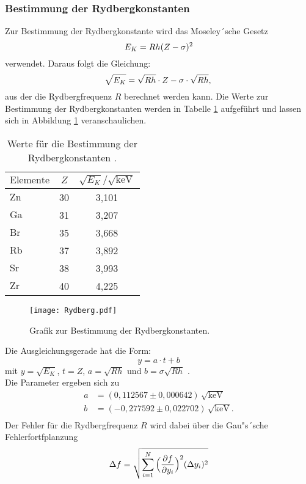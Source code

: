 \subsubsection{Bestimmung der Rydbergkonstanten}
Zur Bestimmung der Rydbergkonstante wird das Moseley´sche Gesetz
\begin{equation}
  E_K = Rh(Z-\sigma)^2 \\
 \end{equation}
 verwendet.
 Daraus folgt die Gleichung:
 \begin{equation}
  \sqrt{E_K} = \sqrt{Rh} \cdot Z- \sigma \cdot\sqrt{Rh},\\
 \end{equation}
 aus der die Rydbergfrequenz $R$ berechnet werden kann.
 Die Werte zur Bestimmung der Rydbergkonstanten werden in Tabelle \ref{tab:Rydberg} aufgeführt und  lassen sich in Abbildung \ref{fig:Rydberg} veranschaulichen.
 \begin{table}[H]
  \centering
  \caption{Werte für die Bestimmung der Rydbergkonstanten .}
  \label{tab:Rydberg}
  \begin{tabular}{|l|c|c|}
    \toprule
      $\text{Elemente}$ &  $Z $      &     $\sqrt{E_K}/\mathrm{\sqrt{keV}} $     \\
      \midrule
      $\text{Zn}$&30&3,101\\
      $\text{Ga}$&31&3,207\\
      $\text{Br}$&35&3,668\\
      $\text{Rb}$&37&3,892\\
      $\text{Sr}$&38&3,993\\
      $\text{Zr}$&40&4,225\\
      \bottomrule
      \end{tabular}
\end{table}

\begin{figure}[H]
  \centering
  \texttt{[image: Rydberg.pdf]}
  \caption{Grafik zur Bestimmung der Rydbergkonstanten.}
  \label{fig:Rydberg}
\end{figure}

Die Ausgleichungsgerade hat die Form:
\begin{equation}
 y=a\cdot t+b 
\end{equation}
mit \(y=\sqrt{E_K}\), \(t=Z\), \(a=\sqrt{Rh}\) und \(b=\sigma\sqrt{Rh}\) .\\
Die Parameter ergeben sich zu
\begin{align*}
  a &=(0,112567 \pm 0,000642)\,\mathrm{\sqrt{keV}} \\
  b &=(-0,277592 \pm 0,022702)\,\mathrm{\sqrt{keV}} .\\
 \end{align*}
 Der Fehler für die Rydbergfrequenz $R$  wird dabei über die Gau"s´sche Fehlerfortfplanzung 
 \begin{equation}
     \Delta f = \sqrt{\sum_{i=1}^N {\Bigl(\frac{\partial f}{\partial y_i}\Bigr)^2 (\Delta y_i)^2}}
 \end{equation}

